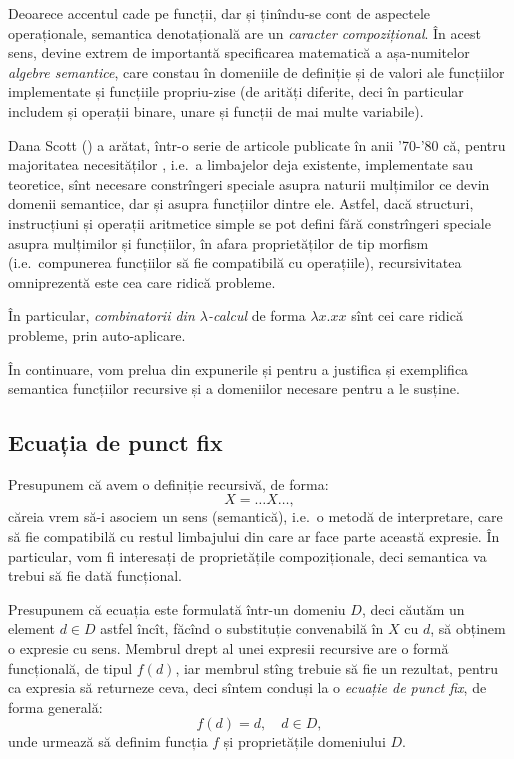 \documentclass[12pt, a4paper]{article}
\begin{document}
Deoarece accentul cade pe funcții, dar și ținîndu-se cont de aspectele
operaționale, semantica denotațională are un \emph{caracter compozițional}. În acest
sens, devine extrem de importantă specificarea matematică a așa-numitelor
\emph{algebre semantice}, care constau în domeniile de definiție și de valori
ale funcțiilor implementate și funcțiile propriu-zise (de arități diferite, deci
în particular includem și operații binare, unare și funcții de mai multe variabile).

Dana Scott (\cite{scottstrachey}) a arătat, într-o serie de articole publicate în
anii '70-'80 că, pentru majoritatea necesităților , i.e.\ a limbajelor deja
existente, implementate sau teoretice, sînt necesare constrîngeri speciale asupra
naturii mulțimilor ce devin domenii semantice, dar și asupra funcțiilor dintre ele.
Astfel, dacă structuri, instrucțiuni și operații aritmetice simple se pot defini
fără constrîngeri speciale asupra mulțimilor și funcțiilor, în afara proprietăților
de tip morfism (i.e.\ compunerea funcțiilor să fie compatibilă cu operațiile),
recursivitatea omniprezentă este cea care ridică probleme.

În particular, \emph{combinatorii din $\lambda$-calcul} de forma $ \lambda x . xx $ sînt
cei care ridică probleme, prin auto-aplicare.

În continuare, vom prelua din expunerile \cite{abrj} și \cite{schm} pentru a justifica
și exemplifica semantica funcțiilor recursive și a domeniilor necesare pentru a le
susține.


\subsection{Ecuația de punct fix}

\indent\indent Presupunem că avem o definiție recursivă, de forma:
\[
  X = \dots X \dots,
\]
căreia vrem să-i asociem un sens (semantică), i.e.\ o metodă de interpretare, care
să fie compatibilă cu restul limbajului din care ar face parte această expresie.
În particular, vom fi interesați de proprietățile compoziționale, deci semantica
va trebui să fie dată funcțional.

Presupunem că ecuația este formulată într-un domeniu $ D $, deci căutăm
un element $ d \in D $ astfel încît, făcînd o substituție convenabilă
în $ X $ cu $ d $, să obținem o expresie cu sens. Membrul drept al unei
expresii recursive are o formă funcțională, de tipul $ f(d) $, iar membrul
stîng trebuie să fie un rezultat, pentru ca expresia să returneze ceva,
deci sîntem conduși la o \emph{ecuație de punct fix}, de forma generală:
\[
  f(d) = d, \quad d \in D,
\]
unde urmează să definim funcția $ f $ și proprietățile domeniului $ D $.
\end{document}
